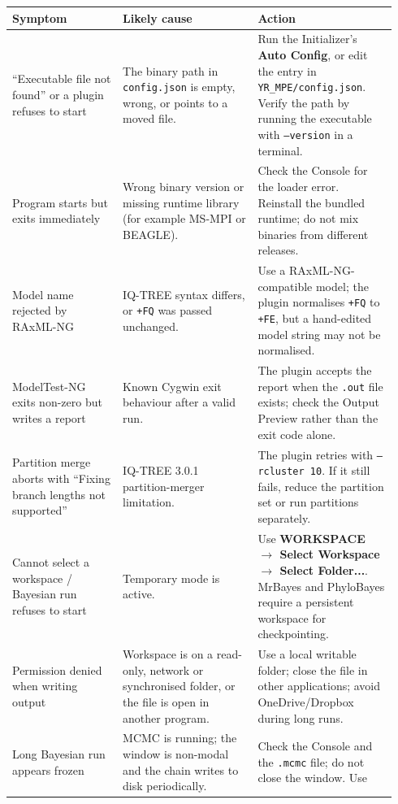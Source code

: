 \documentclass[10pt]{report}
\begin{document}
\begin{longtable}{@{}>{\raggedright\arraybackslash}p{0.27\linewidth}
                      >{\raggedright\arraybackslash}p{0.33\linewidth}
                      >{\raggedright\arraybackslash}p{0.34\linewidth}@{}}
\toprule
Symptom & Likely cause & Action \\
\midrule
\endhead
``Executable file not found'' or a plugin refuses to start &
The binary path in \texttt{config.json} is empty, wrong, or points to a moved
file. & Run the Initializer's \textbf{Auto Config}, or edit the entry in
\texttt{YR\_MPE/config.json}. Verify the path by running the executable with
\texttt{--version} in a terminal. \\
Program starts but exits immediately &
Wrong binary version or missing runtime library (for example MS-MPI or BEAGLE).
& Check the Console for the loader error. Reinstall the bundled runtime; do not
mix binaries from different releases. \\
Model name rejected by RAxML-NG &
IQ-TREE syntax differs, or \texttt{+FQ} was passed unchanged. &
Use a RAxML-NG-compatible model; the plugin normalises \texttt{+FQ} to
\texttt{+FE}, but a hand-edited model string may not be normalised. \\
ModelTest-NG exits non-zero but writes a report &
Known Cygwin exit behaviour after a valid run. &
The plugin accepts the report when the \texttt{.out} file exists; check the
Output Preview rather than the exit code alone. \\
Partition merge aborts with ``Fixing branch lengths not supported'' &
IQ-TREE 3.0.1 partition-merger limitation. &
The plugin retries with \texttt{--rcluster 10}. If it still fails, reduce the
partition set or run partitions separately. \\
Cannot select a workspace / Bayesian run refuses to start &
Temporary mode is active. &
Use \textbf{WORKSPACE $\rightarrow$ Select Workspace $\rightarrow$ Select
Folder...}. MrBayes and PhyloBayes require a persistent workspace for
checkpointing. \\
Permission denied when writing output &
Workspace is on a read-only, network or synchronised folder, or the file is
open in another program. &
Use a local writable folder; close the file in other applications; avoid
OneDrive/Dropbox during long runs. \\
Long Bayesian run appears frozen &
MCMC is running; the window is non-modal and the chain writes to disk
periodically. &
Check the Console and the \texttt{.mcmc} file; do not close the window. Use

\end{longtable}
\end{document}
